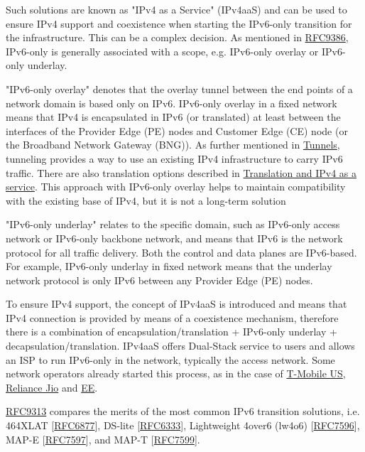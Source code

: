\documentclass[
]{article}
\begin{document}
Such solutions are known as "IPv4 as a Service" (IPv4aaS) and can be
used to ensure IPv4 support and coexistence when starting the IPv6-only
transition for the infrastructure. This can be a complex decision. As
mentioned in \href{https://www.rfc-editor.org/info/rfc9386}{RFC9386},
IPv6-only is generally associated with a scope, e.g. IPv6-only overlay
or IPv6-only underlay.

"IPv6-only overlay" denotes that the overlay tunnel between the end
points of a network domain is based only on IPv6. IPv6-only overlay in a
fixed network means that IPv4 is encapsulated in IPv6 (or translated) at
least between the interfaces of the Provider Edge (PE) nodes and
Customer Edge (CE) node (or the Broadband Network Gateway (BNG)). As
further mentioned in \hyperref[tunnels]{Tunnels}, tunneling provides a
way to use an existing IPv4 infrastructure to carry IPv6 traffic. There
are also translation options described in
\hyperref[translation-and-ipv4-as-a-service]{Translation and IPv4 as a
service}. This approach with IPv6-only overlay helps to maintain
compatibility with the existing base of IPv4, but it is not a long-term
solution

"IPv6-only underlay" relates to the specific domain, such as IPv6-only
access network or IPv6-only backbone network, and means that IPv6 is the
network protocol for all traffic delivery. Both the control and data
planes are IPv6-based. For example, IPv6-only underlay in fixed network
means that the underlay network protocol is only IPv6 between any
Provider Edge (PE) nodes.

To ensure IPv4 support, the concept of IPv4aaS is introduced and means
that IPv4 connection is provided by means of a coexistence mechanism,
therefore there is a combination of encapsulation/translation +
IPv6-only underlay + decapsulation/translation. IPv4aaS offers
Dual-Stack service to users and allows an ISP to run IPv6-only in the
network, typically the access network. Some network operators already
started this process, as in the case of
\href{https://pc.nanog.org/static/published/meetings/NANOG73/1645/20180625_Lagerholm_T-Mobile_S_Journey_To_v1.pdf}{T-Mobile
US},
\href{https://datatracker.ietf.org/meeting/109/materials/slides-109-v6ops-ipv6-only-adoption-challenges-and-standardization-requirements-03}{Reliance
Jio} and
\href{https://indico.uknof.org.uk/event/38/contributions/489/attachments/612/736/Nick_Heatley_EE_IPv6_UKNOF_20170119.pdf}{EE}.

\href{https://www.rfc-editor.org/info/rfc9313}{RFC9313} compares the
merits of the most common IPv6 transition solutions, i.e. 464XLAT
{[}\href{https://www.rfc-editor.org/info/rfc6877}{RFC6877}{]}, DS-lite
{[}\href{https://www.rfc-editor.org/info/rfc6333}{RFC6333}{]},
Lightweight 4over6 (lw4o6)
{[}\href{https://www.rfc-editor.org/info/rfc7596}{RFC7596}{]}, MAP-E
{[}\href{https://www.rfc-editor.org/info/rfc7597}{RFC7597}{]}, and MAP-T
{[}\href{https://www.rfc-editor.org/infoc/rfc7599}{RFC7599}{]}.
\end{document}
